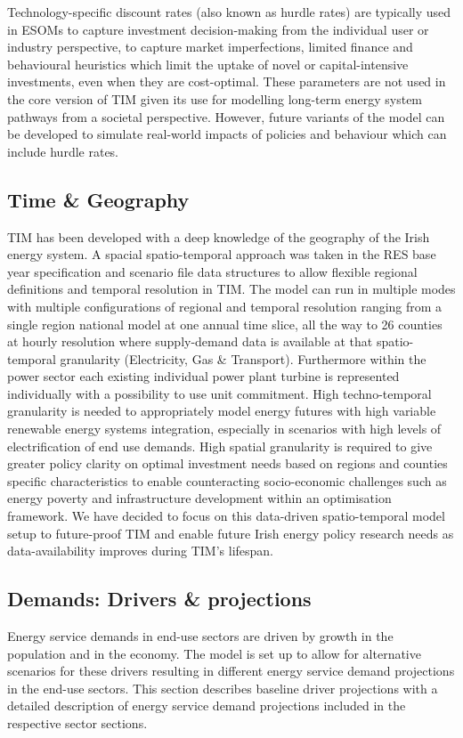 \documentclass[gmd,manuscript]{copernicus}
\begin{document}
Technology-specific discount rates (also known as hurdle rates) are typically used in ESOMs to capture investment decision-making from the individual user or industry perspective, to capture market imperfections, limited finance and behavioural heuristics which limit the uptake of novel or capital-intensive investments, even when they are cost-optimal. These parameters are not used in the core version of TIM given its use for modelling long-term energy system pathways from a societal perspective. However, future variants of the model can be developed to simulate real-world impacts of policies and behaviour which can include hurdle rates. 

\subsection{Time \& Geography}
\label{ss:time_geo}
TIM has been developed with a deep knowledge of the geography of the Irish energy system. A spacial spatio-temporal approach was taken in the RES base year specification and scenario file data structures to allow flexible regional definitions and temporal resolution in TIM. The model can run in multiple modes with multiple configurations of regional and temporal resolution ranging from a single region national model at one annual time slice, all the way to 26 counties at hourly resolution where supply-demand data is available at that spatio-temporal granularity (Electricity, Gas \& Transport). Furthermore within the power sector each existing individual power plant turbine is represented individually with a possibility to use unit commitment. High techno-temporal granularity is needed to appropriately model energy futures with high variable renewable energy systems integration, especially in scenarios with high levels of electrification of end use demands. High spatial granularity is required to give greater policy clarity on optimal investment needs based on regions and counties specific characteristics to enable counteracting socio-economic challenges such as energy poverty and infrastructure development within an optimisation framework. We have decided to focus on this data-driven spatio-temporal model setup to future-proof TIM and enable future Irish energy policy research needs as data-availability improves during TIM's lifespan.

\subsection{Demands: Drivers \& projections}
\label{ss:model_proj}
Energy service demands in end-use sectors are driven by growth in the population and in the economy. The model is set up to allow for alternative scenarios for these drivers resulting in different energy service demand projections in the end-use sectors. This section describes baseline driver projections with a detailed description of energy service demand projections included in the respective sector sections. 
\end{document}
